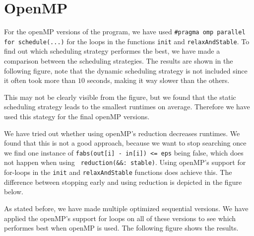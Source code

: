 \documentclass[a4paper]{article}
\begin{document}

\section{OpenMP}
For the openMP versions of the program, we have used \texttt{\#pragma omp parallel for schedule(...)} for the loops in the functions \texttt{init} and \texttt{relaxAndStable}. To find out which scheduling strategy performes the best, we have made a comparison between the scheduling strategies. The results are shown in the following figure, note that the dynamic scheduling strategy is not included since it often took more than $10$ seconds, making it way slower than the others.


This may not be clearly visible from the figure, but we found that the static scheduling strategy leads to the smallest runtimes on average. Therefore we have used this stategy for the final openMP versions.

We have tried out whether using openMP's reduction decreases runtimes. We found that this is not a good approach, because we want to stop searching once we find one instance of \texttt{fabs(out[i] - in[i]) <= eps} being false, which does not happen when using \texttt{ reduction(\&\&: stable)}. Using openMP's support for for-loops in the \texttt{init} and \texttt{relaxAndStable} functions does achieve this. The difference between stopping early and using reduction is depicted in the figure below.


As stated before, we have made multiple optimized sequential versions. We have applied the openMP's support for loops on all of these versions to see which performes best when openMP is used. The following figure shows the results.
\end{document}
